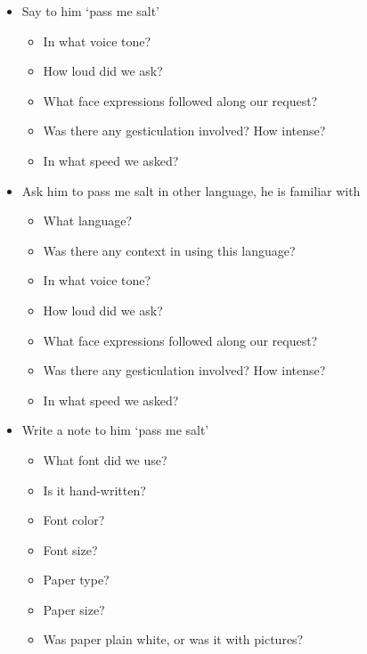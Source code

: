 \documentclass[../../what-is-computer.tex]{subfiles}
\begin{document}
    \begin{itemize}
        \item Say to him `pass me salt'
        \begin{itemize}
            \item In what voice tone?
            \item How loud did we ask?
            \item What face expressions followed along our request?
            \item Was there any gesticulation involved? How intense?
            \item In what speed we asked?
        \end{itemize}

        \item Ask him to pass me salt in other language, he is familiar with
        \begin{itemize}
            \item What language?
            \item Was there any context in using this language?
            \item In what voice tone?
            \item How loud did we ask?
            \item What face expressions followed along our request?
            \item Was there any gesticulation involved? How intense?
            \item In what speed we asked?
        \end{itemize}

        \item Write a note to him `pass me salt'
        \begin{itemize}
            \item What font did we use?
            \item Is it hand-written?
            \item Font color?
            \item Font size?
            \item Paper type?
            \item Paper size?
            \item Was paper plain white, or was it with pictures?
        \end{itemize}


\end{itemize}
\end{document}
